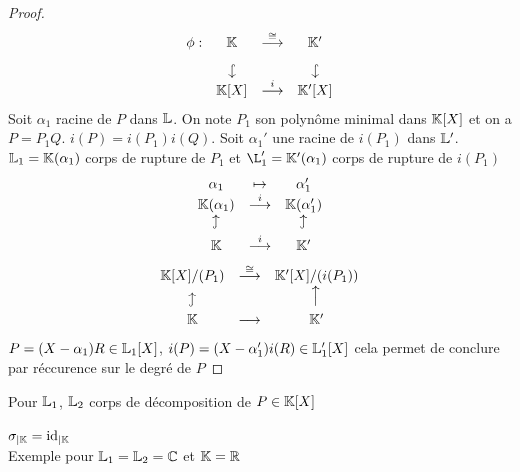 \documentclass[]{report}
\begin{document}
    \begin{proof}
        \[\begin{matrix}
            \phi:&\K&\overset{\cong}{\longrightarrow}&\K'\\
            &\text{\rotatebox{270}{$\hookrightarrow$}}&&\text{\rotatebox{270}{$\hookrightarrow$}}\\
            &\K[X]&\overset{i}{\longrightarrow}&\K'[X]
        \end{matrix}\]
        Soit $\alpha_1$ racine de $P$ dans $\mathbb{L}$. On note $P_1$ son polynôme minimal dans $\mathbb{K}[X]$ et on a $P=P_1 Q$. $i(P)=i(P_1)i(Q)$. Soit $\alpha_1'$ une racine de $i(P_1)$ dans $\mathbb{L}'$. $\mathbb{L}_1=\mathbb{K}(\alpha_1)$ corps de rupture de $P_1$ et $\L_1'=\K'(\alpha_1)$ corps de rupture de $i(P_1)$\\
        \[\begin{matrix}
            \alpha_1&\mapsto&\alpha_1'\\
            \K(\alpha_1)&\overset{i}{\longrightarrow}&\K(\alpha_1')\\
            \text{\rotatebox{90}{$\hookrightarrow$}}&&\text{\rotatebox{90}{$\hookrightarrow$}}\\
            \K&\overset{i}{\longrightarrow}&\K'
        \end{matrix}\]
        \[\begin{matrix}
            \K[X]/(P_1)&\overset{\cong}{\longrightarrow}&\K'[X]/(i(P_1))\\
            \text{\rotatebox{90}{$\hookrightarrow$}}&&\text{\rotatebox{90}{$\longrightarrow$}}\\
            \K&\longrightarrow&\K'
        \end{matrix}\]
        $P=(X-\alpha_1)R\in\mathbb{L}_1[X]$, $i(P)=(X-\alpha_1')i(R)\in\mathbb{L}_1'[X]$ cela permet de conclure par réccurence sur le degré de $P$
    \end{proof}

    \begin{re}{}{}
        Pour $\mathbb{L}_1$, $\mathbb{L}_2$ corps de décomposition de $P\in \mathbb{K}[X]$ \\
        $\sigma_{|\mathbb{K}}=\text{id}_{|\mathbb{K}}$\\
        Exemple pour $\mathbb{L}_1=\mathbb{L}_2=\mathbb{C}$ et $\mathbb{K}=\mathbb{R}$
    \end{re}
    
\end{document}
